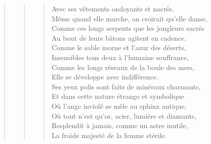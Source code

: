\documentclass[french,twoside]{book} %
\begin{document}
\begin{verse}
\begin{verse}
\begin{verse}
Avec ses vêtements ondoyants et nacrés,\\
Même quand elle marche, on croirait qu’elle danse,\\
Comme ces longs serpents que les jongleurs sacrés\\
Au bout de leurs bâtons agitent en cadence.\\
Comme le sable morne et l’azur des déserts,\\
Insensibles tous deux à l’humaine souffrance,\\
Comme les longs réseaux de la boule des mers,\\
Elle se développe avec indifférence.\\
Ses yeux polis sont faits de minéraux charmants,\\
Et dans cette nature étrange et symbolique\\
Où l’ange inviolé se mêle au sphinx antique,\\
Où tout n’est qu’or, acier, lumière et diamants,\\
Resplendit à jamais, comme un astre inutile,\\
La froide majesté de la femme stérile.\\
\end{verse}


\end{verse}
\end{verse}
\end{document}

